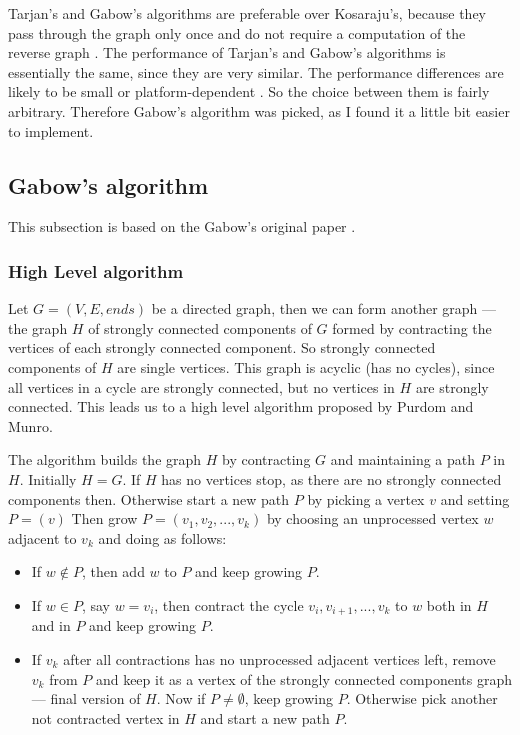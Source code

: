 \documentclass{report}
\theoremstyle{plain}
\theoremstyle{definition}
\theoremstyle{remark}
\numberwithin{definition}{chapter}
\numberwithin{example}{chapter}
\numberwithin{figure}{chapter}
\numberwithin{theorem}{chapter}
\numberwithin{lemma}{chapter}
\begin{document}
Tarjan's and Gabow's algorithms are preferable over Kosaraju's, because they pass through the graph only once and do not require a computation of the reverse graph \cite{c++_sedgewick}. The performance of Tarjan's and Gabow's algorithms is essentially the same, since they are very similar. The performance differences are likely to be small or platform-dependent \cite{Gabow2000107}. So the choice between them is fairly arbitrary. Therefore Gabow's algorithm was picked, as I found it a little bit easier to implement.

\subsection{Gabow's algorithm}

This subsection is based on the Gabow's original paper \cite{Gabow2000107}.

\subsubsection*{High Level algorithm}

Let $G=(V, E, ends)$ be a directed graph, then we can form another graph --- the graph $H$ of strongly connected components of $G$ formed by contracting the vertices of each strongly connected component. So strongly connected components of $H$ are single vertices. This graph is acyclic (has no cycles), since all vertices in a cycle are strongly connected, but no vertices in $H$ are strongly connected. This leads us to a high level algorithm proposed by Purdom and Munro.

The algorithm builds the graph $H$ by contracting $G$ and maintaining a path $P$ in $H$. Initially $H=G$. If $H$ has no vertices stop, as there are no strongly connected components then. Otherwise start a new path $P$ by picking a vertex $v$ and setting $P = (v)$ Then grow $P=(v_1,v_2,...,v_k)$ by choosing an unprocessed vertex $w$ adjacent to $v_k$ and doing as follows:

\begin{itemize}
  \item If $w \not \in P$, then add $w$ to $P$ and keep growing $P$.
  \item If $w \in P$, say $w=v_i$, then contract the cycle $v_i,v_{i+1},...,v_k$ to $w$ both in $H$ and in $P$ and keep growing $P$.
  \item If $v_k$ after all contractions has no unprocessed adjacent vertices left, remove $v_k$ from $P$ and keep it as a vertex of the strongly connected components graph --- final version of $H$. Now if $P \not = \emptyset$, keep growing $P$. Otherwise pick another not contracted vertex in $H$ and start a new path $P$.
\end{itemize}
\end{document}
